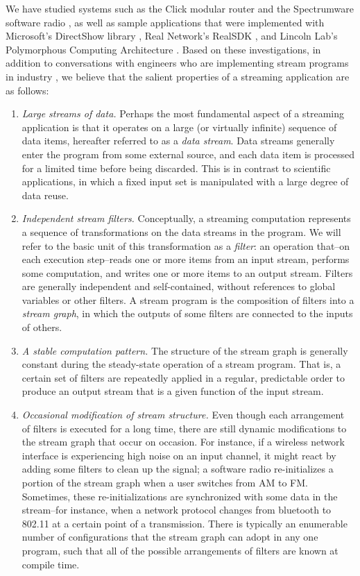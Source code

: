 We have studied systems such as the Click modular router \cite{click}
and the Spectrumware software radio
\cite{spectrumware,softwareradio}, as well as sample applications
that were implemented with Microsoft's DirectShow library
\cite{directshow}, Real Network's RealSDK
\cite{realsdk}, and Lincoln Lab's Polymorphous Computing Architecture
\cite{pca}.  Based on these investigations, in addition to conversations with engineers who are implementing stream programs in industry \cite{nokia,vanu}, we believe that the salient properties of a streaming application are as follows:
\begin{enumerate}
\item {\it Large streams of data.}  Perhaps the most fundamental
aspect of a streaming application is that it operates on a large (or
virtually infinite) sequence of data items, hereafter referred to as a
{\it data stream}.  Data streams generally enter the program from some
external source, and each data item is processed for a limited time
before being discarded.  This is in contrast to scientific
applications, in which a fixed input set is manipulated with a large
degree of data reuse.

\item {\it Independent stream filters.}  Conceptually, a streaming computation
represents a sequence of transformations on the data streams in the
program.  We will refer to the basic unit of this transformation as a
{\it filter}: an operation that--on each execution step--reads one or
more items from an input stream, performs some computation, and writes
one or more items to an output stream.  Filters are generally
independent and self-contained, without references to global variables
or other filters.  A stream program is the composition of filters into
a {\it stream graph}, in which the outputs of some filters are
connected to the inputs of others.

\item {\it A stable computation pattern.}  The structure of the stream
graph is generally constant during the steady-state operation of a
stream program.  That is, a certain set of filters are repeatedly
applied in a regular, predictable order to produce an output stream
that is a given function of the input stream.

\item {\it Occasional modification of stream structure.}  Even though each
arrangement of filters is executed for a long time, there are still
dynamic modifications to the stream graph that occur on occasion.  For
instance, if a wireless network interface is experiencing high noise
on an input channel, it might react by adding some filters to clean up
the signal; a software radio re-initializes a portion of the stream
graph when a user switches from AM to FM.  Sometimes, these
re-initializations are synchronized with some data in the stream--for
instance, when a network protocol changes from bluetooth to 802.11 at
a certain point of a transmission.  There is typically an enumerable
number of configurations that the stream graph can adopt in any one
program, such that all of the possible arrangements of filters are
known at compile time.


\end{enumerate}
